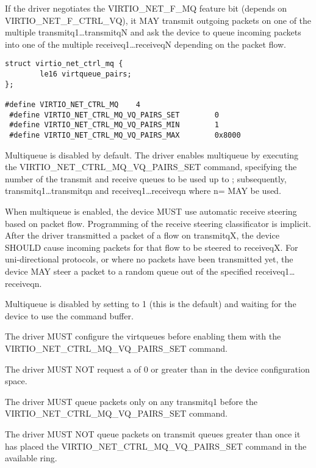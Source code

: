 If the driver negotiates the VIRTIO_NET_F_MQ feature bit (depends
on VIRTIO_NET_F_CTRL_VQ), it MAY transmit outgoing packets on one
of the multiple transmitq1\ldots transmitqN and ask the device to
queue incoming packets into one of the multiple receiveq1\ldots receiveqN
depending on the packet flow.

\begin{lstlisting}
struct virtio_net_ctrl_mq {
        le16 virtqueue_pairs;
};

#define VIRTIO_NET_CTRL_MQ    4
 #define VIRTIO_NET_CTRL_MQ_VQ_PAIRS_SET        0
 #define VIRTIO_NET_CTRL_MQ_VQ_PAIRS_MIN        1
 #define VIRTIO_NET_CTRL_MQ_VQ_PAIRS_MAX        0x8000
\end{lstlisting}

Multiqueue is disabled by default. The driver enables multiqueue by
executing the VIRTIO_NET_CTRL_MQ_VQ_PAIRS_SET command, specifying
the number of the transmit and receive queues to be used up to
; subsequently,
transmitq1\ldots transmitqn and receiveq1\ldots receiveqn where
n= MAY be used.

When multiqueue is enabled, the device MUST use automatic receive steering
based on packet flow. Programming of the receive steering
classificator is implicit. After the driver transmitted a packet of a
flow on transmitqX, the device SHOULD cause incoming packets for that flow to
be steered to receiveqX. For uni-directional protocols, or where
no packets have been transmitted yet, the device MAY steer a packet
to a random queue out of the specified receiveq1\ldots receiveqn.

Multiqueue is disabled by setting  to 1 (this is
the default) and waiting for the device to use the command buffer.


The driver MUST configure the virtqueues before enabling them with the 
VIRTIO_NET_CTRL_MQ_VQ_PAIRS_SET command.

The driver MUST NOT request a  of 0 or
greater than  in the device configuration space.

The driver MUST queue packets only on any transmitq1 before the 
VIRTIO_NET_CTRL_MQ_VQ_PAIRS_SET command.

The driver MUST NOT queue packets on transmit queues greater than
 once it has placed the VIRTIO_NET_CTRL_MQ_VQ_PAIRS_SET command in the available ring.

